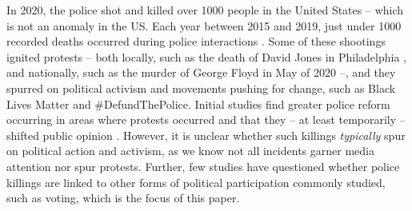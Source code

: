 \documentclass[12pt]{article}
\begin{document}
In 2020, the police shot and killed over 1000 people in the United States -- which is not an anomaly in the US. Each year between 2015 and 2019, just under 1000 recorded deaths occurred during police interactions \citep{sullivan2019four}. 
Some of these shootings ignited protests -- both locally, such as the death of David Jones in Philadelphia \citep{davidjones}, and nationally, such as the murder of George Floyd in May of 2020 \citep{georgefloyd}--, and they spurred on political activism and movements pushing for change, such as Black Lives Matter and \#DefundThePolice. Initial studies find greater police reform occurring in areas where protests occurred \citep{olzak2021does} and that they -- at least temporarily -- shifted public opinion \citep{Reny2021,wasow2020agenda}. 
However, it is unclear whether such killings \textit{typically} spur on political action and activism, as we know not all incidents garner media attention nor spur protests. Further, few studies have questioned whether police killings are linked to other forms of political participation commonly studied, such as voting, which is the focus of this paper.  
\end{document}
